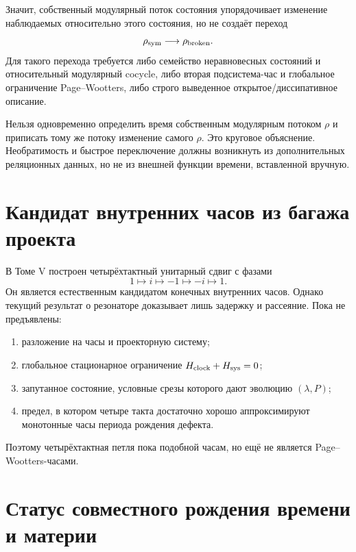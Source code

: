 Значит, собственный модулярный поток состояния упорядочивает изменение
наблюдаемых относительно этого состояния, но не создаёт переход
\begin{equation}
 \rho_{\rm sym}\longrightarrow\rho_{\rm broken}.
\end{equation}
Для такого перехода требуется либо семейство неравновесных состояний и
относительный модулярный cocycle, либо вторая подсистема-час и глобальное
ограничение Page--Wootters, либо строго выведенное открытое/диссипативное
описание.

\begin{nogocriterion}
Нельзя одновременно определить время собственным модулярным потоком
$\rho$ и приписать тому же потоку изменение самого $\rho$. Это круговое
объяснение. Необратимость и быстрое переключение должны возникнуть из дополнительных
реляционных данных, но не из внешней функции времени, вставленной вручную.
\end{nogocriterion}

\section{Кандидат внутренних часов из багажа проекта}

В Томе V построен четырёхтактный унитарный сдвиг с фазами
\begin{equation}
 1\longmapsto i\longmapsto-1\longmapsto-i\longmapsto1.
\end{equation}
Он является естественным кандидатом конечных внутренних часов. Однако
текущий результат о резонаторе доказывает лишь задержку и рассеяние. Пока
не предъявлены:
\begin{enumerate}
 \item разложение на часы и проекторную систему;
 \item глобальное стационарное ограничение
 $H_{\rm clock}+H_{\rm sys}=0$;
 \item запутанное состояние, условные срезы которого дают эволюцию
 $(\lambda,P)$;
 \item предел, в котором четыре такта достаточно хорошо аппроксимируют
 монотонные часы периода рождения дефекта.
\end{enumerate}
Поэтому четырёхтактная петля пока подобной часам, но ещё не является
Page--Wootters-часами.

\section{Статус совместного рождения времени и материи}

